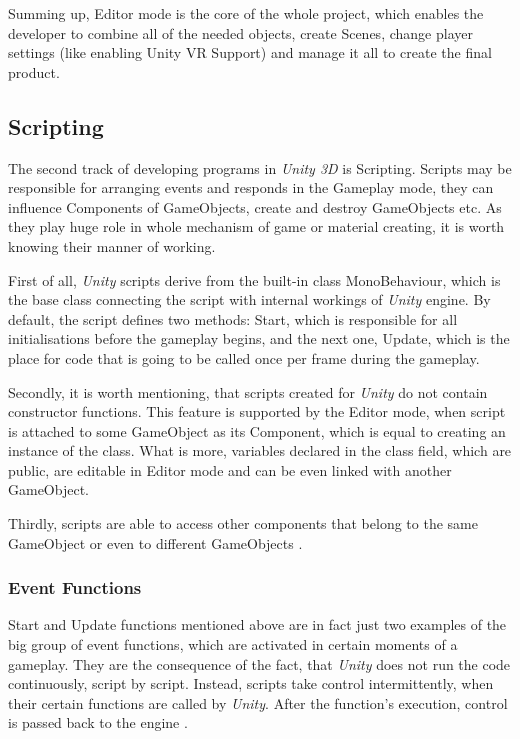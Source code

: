 Summing up, Editor mode is the core of the whole project, which enables the developer to combine all of the needed objects, create Scenes, change player settings (like enabling Unity VR Support) and manage it all to create the final product.


\subsection{Scripting}

The second track of developing programs in \textit{Unity 3D} is Scripting. Scripts may be responsible for arranging events and responds in the Gameplay mode, they can influence Components of GameObjects, create and destroy GameObjects etc. As they play huge role in whole mechanism of game or material creating, it is worth knowing their manner of working.

First of all, \textit{Unity} scripts derive from the built-in class MonoBehaviour, which is the base class connecting the script with internal workings of \textit{Unity} engine. By default, the script defines two methods: Start, which is responsible for all initialisations before the gameplay begins, and the next one, Update, which is the place for code that is going to be called once per frame during the gameplay. 

Secondly, it is worth mentioning, that scripts created for \textit{Unity} do not contain constructor functions. This feature is supported by the Editor mode, when script is attached to some GameObject as its Component, which is equal to creating an instance of the class. What is more, variables declared in the class field, which are public, are editable in Editor mode and can be even linked with another GameObject.

Thirdly, scripts are able to access other components that belong to the same GameObject or even to different GameObjects \cite{Unity16}. 

\subsubsection{Event Functions}

Start and Update functions mentioned above are in fact just two examples of the big group of event functions, which are activated  in certain moments of a gameplay. They are the consequence of the fact, that \textit{Unity} does not run the code continuously, script by script. Instead, scripts take control intermittently, when their certain functions are called by \textit{Unity}. After the function's execution, control is passed back to the engine \cite{Unity16}. 


